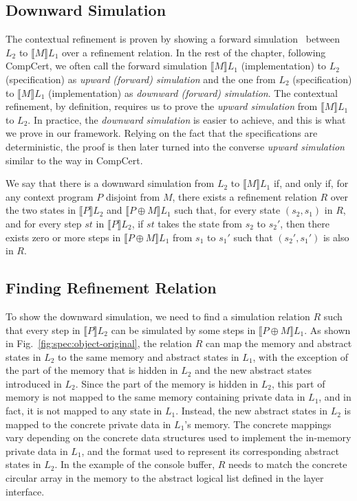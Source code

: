 \subsection{Downward Simulation}

The contextual refinement is proven by showing a forward
simulation~\cite{Lynch95} between $L_2$
to $\llbracket{}M\rrbracket{}L_1$ over a refinement relation.
In the rest of the chapter, following CompCert, we often call the
forward simulation $\llbracket{}M\rrbracket{}L_1$ (implementation)
to $L_2$ (specification) as {\em upward (forward) simulation} and
the one from $L_2$ (specification) to $\llbracket{}M\rrbracket{}L_1$
(implementation) as {\em downward (forward) simulation}.
The contextual refinement, by definition, requires us to prove
the {\em upward simulation} from $\llbracket{}M\rrbracket{}L_1$
to $L_2$. In practice, the {\em downward simulation} is easier to
achieve, and this is what we prove in our framework. Relying
on the fact that the specifications are deterministic, the proof
is then later turned into the converse {\em upward simulation}
similar to the way in CompCert.

\begin{definition}
We say that there is a downward simulation from $L_2$ to
$\llbracket{}M\rrbracket{}L_1$ if, and only if, for any
context program $P$ disjoint from $M$, there exists a refinement relation
$R$ over the two states in $\llbracket{}P\rrbracket{}L_2$ and
$\llbracket{}{P \oplus M}\rrbracket{}L_1$ such that, for
every state $(s_2, s_1)$ in $R$, and for every step $st$ in $\llbracket{}P\rrbracket{}L_2$,
if $st$ takes the state from $s_2$ to $s_2'$, then there exists
zero or more steps in $\llbracket{}{P \oplus M}\rrbracket{}L_1$ from
$s_1$ to $s_1'$ such that $(s_2', s_1')$ is also in $R$.
\end{definition}

\subsection{Finding Refinement Relation}

To show the downward simulation, we need to find a simulation relation $R$
such that every step in $\llbracket{}P\rrbracket{}L_2$ can be simulated by
some steps in $\llbracket{}{P \oplus M}\rrbracket{}L_1$.
As shown in Fig.~\ref{fig:spec:object-original}, the relation $R$ can
map the memory and abstract states in $L_2$ to the same memory and abstract
states in $L_1$, with the exception of the part of the memory that is hidden in
$L_2$ and the new abstract states introduced in $L_2$. Since the part of the
memory is hidden in $L_2$, this part of memory is not mapped to
the same memory containing private data in $L_1$, and in fact, it is not
mapped to any state in $L_1$. Instead, the new abstract states in $L_2$
is mapped to the concrete private data in $L_1$'s memory. The concrete
mappings vary depending on the concrete data structures used to implement
the in-memory private data in $L_1$, and the format used to represent
its corresponding abstract states in $L_2$. In the example of the console
buffer, $R$ needs to match the concrete circular array in the memory
to the abstract logical list defined in the layer interface.


